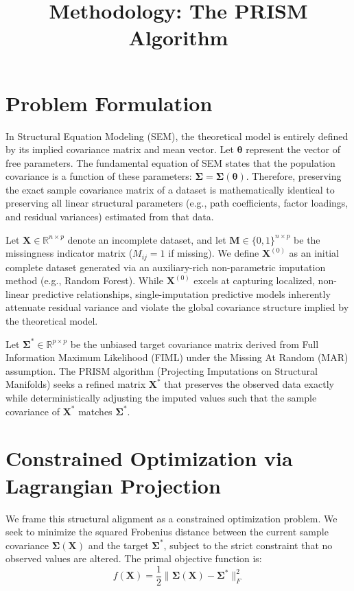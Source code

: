 \documentclass[11pt]{article}
\title{Methodology: The PRISM Algorithm}
\author{}
\date{}
\begin{document}
\raggedbottom

\maketitle

\section{Problem Formulation}
In Structural Equation Modeling (SEM), the theoretical model is entirely defined by its implied covariance matrix and mean vector. Let $\bm{\theta}$ represent the vector of free parameters. The fundamental equation of SEM states that the population covariance is a function of these parameters: $\bm{\Sigma} = \bm{\Sigma}(\bm{\theta})$. Therefore, preserving the exact sample covariance matrix of a dataset is mathematically identical to preserving all linear structural parameters (e.g., path coefficients, factor loadings, and residual variances) estimated from that data.

Let $\bm{X} \in \mathbb{R}^{n \times p}$ denote an incomplete dataset, and let $\bm{M} \in \{0, 1\}^{n \times p}$ be the missingness indicator matrix ($M_{ij} = 1$ if missing). We define $\bm{X}^{(0)}$ as an initial complete dataset generated via an auxiliary-rich non-parametric imputation method (e.g., Random Forest). While $\bm{X}^{(0)}$ excels at capturing localized, non-linear predictive relationships, single-imputation predictive models inherently attenuate residual variance and violate the global covariance structure implied by the theoretical model.

Let $\bm{\Sigma}^* \in \mathbb{R}^{p \times p}$ be the unbiased target covariance matrix derived from Full Information Maximum Likelihood (FIML) under the Missing At Random (MAR) assumption. The PRISM algorithm (Projecting Imputations on Structural Manifolds) seeks a refined matrix $\bm{X}^*$ that preserves the observed data exactly while deterministically adjusting the imputed values such that the sample covariance of $\bm{X}^*$ matches $\bm{\Sigma}^*$.

\section{Constrained Optimization via Lagrangian Projection}
We frame this structural alignment as a constrained optimization problem. We seek to minimize the squared Frobenius distance between the current sample covariance $\bm{\Sigma}(\bm{X})$ and the target $\bm{\Sigma}^*$, subject to the strict constraint that no observed values are altered. The primal objective function is:
$$ f(\bm{X}) = \frac{1}{2} \big\| \bm{\Sigma}(\bm{X}) - \bm{\Sigma}^* \big\|_F^2 $$
\end{document}
